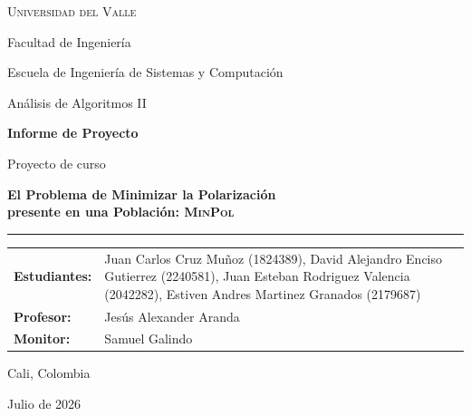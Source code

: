 \documentclass[11pt,letterpaper]{article}
\newcommand{\MinPol}{{\normalfont\scshape MinPol}}
\begin{document}
\begin{titlepage}
\centering

{\Large\scshape Universidad del Valle\par}
\vspace{0.25cm}
{\large Facultad de Ingeniería\par}
\vspace{0.1cm}
{\large Escuela de Ingeniería de Sistemas y Computación\par}
\vspace{0.1cm}
{\large Análisis de Algoritmos II\par}

\vspace{1.35cm}

{\LARGE\bfseries Informe de Proyecto\par}
\vspace{0.35cm}
{\large Proyecto de curso\par}

\vspace{1.1cm}

{\LARGE\bfseries
El Problema de Minimizar la Polarización\\
presente en una Población: \MinPol\par}

\vspace{0.7cm}
\rule{0.82\textwidth}{0.5pt}
\vspace{1.0cm}

\begin{minipage}{0.84\textwidth}
\begin{tabularx}{\textwidth}{@{}>{\bfseries}p{2.8cm}X@{}}
Estudiantes: &
Juan Carlos Cruz Muñoz (1824389), David\newline
Alejandro Enciso Gutierrez (2240581), Juan\newline
Esteban Rodriguez Valencia (2042282),\newline
Estiven Andres Martinez Granados (2179687)\\[0.65em]
Profesor: & Jesús Alexander Aranda\\[0.25em]
Monitor: & Samuel Galindo
\end{tabularx}
\end{minipage}

\vfill

{\large Cali, Colombia\par}
\vspace{0.15cm}
{\large Julio de 2026\par}
\end{titlepage}
\end{document}
